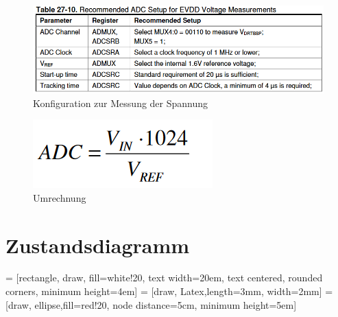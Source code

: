\documentclass[]{article}
\begin{document}
\begin{figure}[!h]
	\centering
	\includegraphics[scale=0.60]{images/Einstellungen}
	\caption{Konfiguration zur Messung der Spannung}
	\label{img:Konfiguration}
\end{figure}

\begin{figure}[!h]
	\centering
	\includegraphics[scale=0.60]{images/Formel}
	\caption{Umrechnung}
	\label{img:Formel}
\end{figure}

	\section{Zustandsdiagramm}
 = [rectangle, draw, fill=white!20, text width=20em, text centered, rounded corners, minimum height=4em]
 = [draw, Latex,length=3mm, width=2mm]
 = [draw, ellipse,fill=red!20, node distance=5cm, minimum height=5em]
\end{document}
